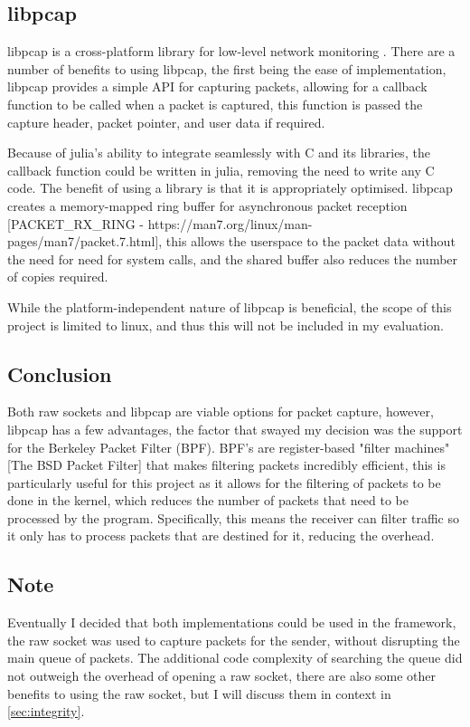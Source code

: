 \subsection{libpcap}

libpcap is a cross-platform library for low-level network monitoring \cite{libpcap}. 
There are a number of benefits to using libpcap, the first being the ease of implementation, libpcap provides a simple API for capturing packets, allowing for a callback function to be called when a packet is captured, this function is passed the capture header, packet pointer, and user data if required.

Because of julia's ability to integrate seamlessly with C and its libraries, the callback function could be written in julia, removing the need to write any C code. The benefit of using a library is that it is appropriately optimised. libpcap creates a memory-mapped ring buffer for asynchronous packet reception [PACKET\_RX\_RING - https://man7.org/linux/man-pages/man7/packet.7.html], this allows the userspace to the packet data without the need for need for system calls, and the shared buffer also reduces the number of copies required.

While the platform-independent nature of libpcap is beneficial, the scope of this project is limited to linux, and thus this will not be included in my evaluation.

\subsection{Conclusion}

Both raw sockets and libpcap are viable options for packet capture, however, libpcap has a few advantages, the factor that swayed my decision was the support for the Berkeley Packet Filter (BPF). BPF's are register-based "filter machines" [The BSD Packet Filter] that makes filtering packets incredibly efficient, this is particularly useful for this project as it allows for the filtering of packets to be done in the kernel, which reduces the number of packets that need to be processed by the program. Specifically, this means the receiver can filter traffic so it only has to process packets that are destined for it, reducing the overhead.

\subsection{Note}

Eventually I decided that both implementations could be used in the framework, the raw socket was used to capture packets for the sender, without disrupting the main queue of packets. The additional code complexity of searching the queue did not outweigh the overhead of opening a raw socket, there are also some other benefits to using the raw socket, but I will discuss them in context in \ref{sec:integrity}.

